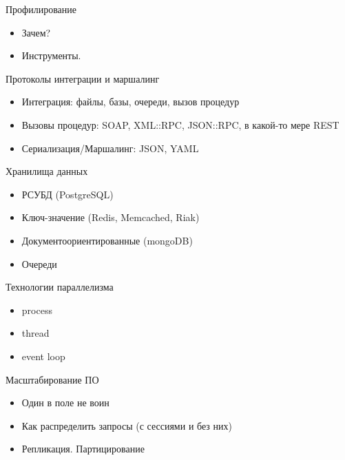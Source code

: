 \documentclass[aspectratio=169]{beamer}
\begin{document}
\begin{frame}{Профилирование}
\begin{itemize}
\item Зачем?
\pause
\item Инструменты.
\end{itemize}
\end{frame}

\begin{frame}{Протоколы интеграции и маршалинг}
\begin{itemize}
\item Интеграция: файлы, базы, очереди, вызов процедур
\pause
\item Вызовы процедур: SOAP, XML::RPC, JSON::RPC, в какой-то мере REST
\pause
\item Сериализация/Маршалинг: JSON, YAML
\end{itemize}
\end{frame}

\begin{frame}{Хранилища данных}
\begin{itemize}
\item РСУБД (PostgreSQL)
\pause
\item Ключ-значение (Redis, Memcached, Riak)
\pause
\item Документоориентированные (mongoDB)
\pause
\item Очереди
\end{itemize}
\end{frame}

\begin{frame}{Технологии параллелизма}
\begin{itemize}
\item process
\pause
\item thread
\pause
\item event loop
\end{itemize}
\end{frame}

\begin{frame}{Масштабирование ПО}
\begin{itemize}
\item Один в поле не воин
\pause
\item Как распределить запросы (с сессиями и без них)
\pause
\item Репликация. Партицирование
\end{itemize}
\end{frame}
\end{document}

